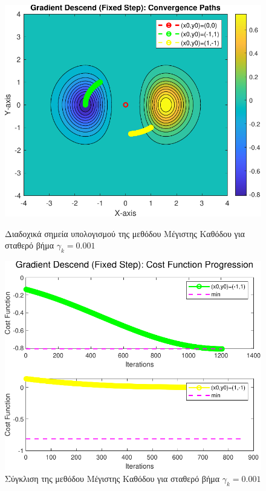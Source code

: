 \documentclass[a4paper,12pt]{article}
\begin{document}
\begin{figure}[h]
    \centering
    \begin{minipage}{0.47\textwidth} %
        \centering
        \includegraphics[width=1\linewidth]{plot/gradient_descend_fixed_step_contour.pdf}
        \caption{\small Διαδοχικά σημεία υπολογισμού της μεθόδου Μέγιστης Καθόδου για σταθερό βήμα $\gamma_k=0.001$}
        \label{fig:gradient_descend_fixed_step_contour}
    \end{minipage} \hfill
    \begin{minipage}{0.47\textwidth} %
        \centering
        \includegraphics[width=1\linewidth]{plot/gradient_descend_fixed_step_costs.pdf}
        \caption{\small Σύγκλιση της μεθόδου Μέγιστης Καθόδου για σταθερό βήμα $\gamma_k=0.001$}
        \label{fig:gradient_descend_fixed_step_costs}
    \end{minipage}
\end{figure}
\end{document}
